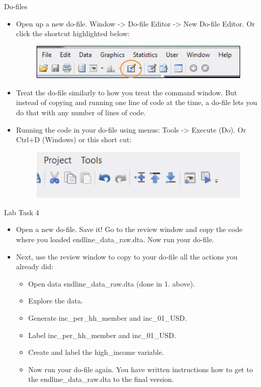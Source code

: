 \documentclass[aspectratio=169]{beamer}
\begin{document}
\begin{frame}{Do-files}
\begin{itemize}
	\item Open up a new do-file. Window -> Do-file Editor -> New Do-file Editor. Or click the shortcut highlighted below:
		\begin{figure}
			\centering
			\includegraphics[width=.6\linewidth]{img/dofilewindow1}
		\end{figure}
	\item Treat the do-file similarly to how you treat the command window. But instead of copying and running one line of code at the time, a do-file lets you do that with any number of lines of code.
	\item Running the code in your do-file using menus: Tools -> Execute (Do). Or Ctrl+D (Windows) or this short cut:
	\begin{figure}
		\centering
		\includegraphics[width=.5\linewidth]{img/dofilewindow2}
	\end{figure}
\end{itemize}
\end{frame}

\begin{frame}{Lab Task 4}
\begin{itemize}
	\item Open a new do-file. Save it! Go to the review window and copy the code where you loaded endline\_data\_raw.dta. Now run your do-file.
	\item Next, use the review window to copy to your do-file all the actions you already did:
		\begin{itemize}
			\item Open data endline\_data\_raw.dta (done in 1. above).
			\item Explore the data.
			\item Generate inc\_per\_hh\_member and inc\_01\_USD.
			\item Label inc\_per\_hh\_member and inc\_01\_USD.
			\item Create and label the high\_income variable.
			\item Now run your do-file again. You have written instructions how to get to the endline\_data\_raw.dta to the final version.
		\end{itemize}
\end{itemize}
\end{frame}
\end{document}
